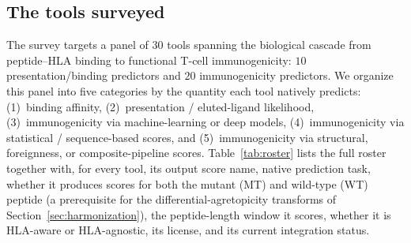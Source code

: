 \subsection{The tools surveyed}
\label{sec:tools}

The survey targets a panel of $30$ tools spanning the biological cascade from
peptide--HLA binding to functional T-cell immunogenicity: $10$
presentation/binding predictors and $20$ immunogenicity predictors. We organize
this panel into five categories by the quantity each tool natively predicts:
(1)~binding affinity, (2)~presentation / eluted-ligand likelihood,
(3)~immunogenicity via machine-learning or deep models, (4)~immunogenicity via
statistical / sequence-based scores, and (5)~immunogenicity via structural,
foreignness, or composite-pipeline scores. Table~\ref{tab:roster} lists the full
roster together with, for every tool, its output score name, native prediction
task, whether it produces scores for both the mutant (MT) and wild-type (WT)
peptide (a prerequisite for the differential-agretopicity transforms of
Section~\ref{sec:harmonization}), the peptide-length window it scores, whether it
is HLA-aware or HLA-agnostic, its license, and its current integration status.

